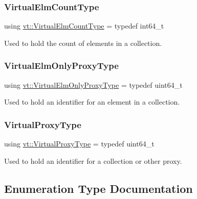 \subsubsection{\texorpdfstring{Virtual\+Elm\+Count\+Type}{VirtualElmCountType}}
{\footnotesize\ttfamily using \hyperlink{namespacevt_ac115668758184050beff7a9281a2c490}{vt\+::\+Virtual\+Elm\+Count\+Type} = typedef int64\+\_\+t}



Used to hold the count of elements in a collection. 

\mbox{\label{namespacevt_aa68633cd16822ae31c1cf521f817a23e}} 
\subsubsection{\texorpdfstring{Virtual\+Elm\+Only\+Proxy\+Type}{VirtualElmOnlyProxyType}}
{\footnotesize\ttfamily using \hyperlink{namespacevt_aa68633cd16822ae31c1cf521f817a23e}{vt\+::\+Virtual\+Elm\+Only\+Proxy\+Type} = typedef uint64\+\_\+t}



Used to hold an identifier for an element in a collection. 

\mbox{\label{namespacevt_a1b417dd5d684f045bb58a0ede70045ac}} 
\subsubsection{\texorpdfstring{Virtual\+Proxy\+Type}{VirtualProxyType}}
{\footnotesize\ttfamily using \hyperlink{namespacevt_a1b417dd5d684f045bb58a0ede70045ac}{vt\+::\+Virtual\+Proxy\+Type} = typedef uint64\+\_\+t}



Used to hold an identifier for a collection or other proxy. 



\subsection{Enumeration Type Documentation}
\mbox{\label{namespacevt_af182285b57b225b163d5d8aff03cb8c2}} 
